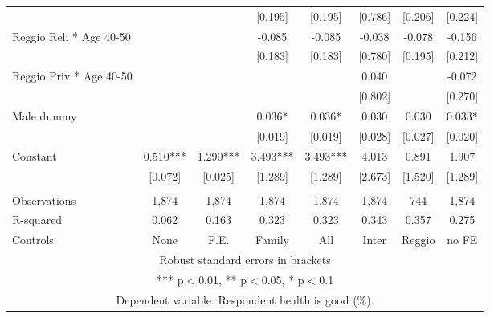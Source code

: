 \begin{tabular}{lccccccc}
 &  &  & [0.195] & [0.195] & [0.786] & [0.206] & [0.224] \\
Reggio Reli * Age 40-50 &  &  & -0.085 & -0.085 & -0.038 & -0.078 & -0.156 \\
 &  &  & [0.183] & [0.183] & [0.780] & [0.195] & [0.212] \\
Reggio Priv * Age 40-50 &  &  &  &  & 0.040 &  & -0.072 \\
 &  &  &  &  & [0.802] &  & [0.270] \\
Male dummy &  &  & 0.036* & 0.036* & 0.030 & 0.030 & 0.033* \\
 &  &  & [0.019] & [0.019] & [0.028] & [0.027] & [0.020] \\
Constant & 0.510*** & 1.290*** & 3.493*** & 3.493*** & 4.013 & 0.891 & 1.907 \\
 & [0.072] & [0.025] & [1.289] & [1.289] & [2.673] & [1.520] & [1.289] \\
 &  &  &  &  &  &  &  \\
Observations & 1,874 & 1,874 & 1,874 & 1,874 & 1,874 & 744 & 1,874 \\
R-squared & 0.062 & 0.163 & 0.323 & 0.323 & 0.343 & 0.357 & 0.275 \\
 Controls & None & F.E. & Family & All & Inter & Reggio & no FE \\ \hline
\multicolumn{8}{c}{ Robust standard errors in brackets} \\
\multicolumn{8}{c}{ *** p$<$0.01, ** p$<$0.05, * p$<$0.1} \\
\multicolumn{8}{c}{ Dependent variable: Respondent health is good (\%).} \\
\end{tabular}
